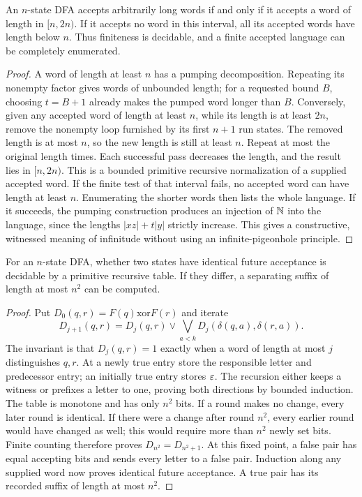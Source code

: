 \begin{theorem}\label{reg:finiteness}
An $n$-state DFA accepts arbitrarily long words if and only if it accepts
a word of length in $[n,2n)$.  If it accepts no word in this interval,
all its accepted words have length below $n$.  Thus finiteness is decidable,
and a finite accepted language can be completely enumerated.
\end{theorem}
\begin{proof}
A word of length at least $n$ has a pumping decomposition.  Repeating its
nonempty factor gives words of unbounded length; for a requested bound
$B$, choosing $t=B+1$ already makes the pumped word longer than $B$.
Conversely, given any accepted word of length at least $n$, while its
length is at least $2n$, remove the nonempty loop furnished by its first
$n+1$ run states.  The removed length is at most $n$, so the new length
is still at least $n$.  Repeat at most the original length times.  Each
successful pass decreases the length, and the result lies in $[n,2n)$.
This is a bounded primitive recursive normalization of a supplied
accepted word.  If the finite test of that interval fails, no accepted
word can have length at least $n$.  Enumerating the shorter words then
lists the whole language.  If it succeeds, the pumping construction
produces an injection of $\mathbb N$ into the language, since the lengths
$|xz|+t|y|$ strictly increase.  This gives a constructive, witnessed
meaning of infinitude without using an infinite-pigeonhole principle.
\end{proof}

\begin{proposition}\label{reg:distinguish}
For an $n$-state DFA, whether two states have identical future acceptance
is decidable by a primitive recursive table.  If they differ, a
separating suffix of length at most $n^2$ can be computed.
\end{proposition}
\begin{proof}
Put $D_0(q,r)=F(q)\mathbin{\mathrm{xor}}F(r)$ and iterate
\[
 D_{j+1}(q,r)=D_j(q,r)\vee
   \bigvee_{a<k}D_j(\delta(q,a),\delta(r,a)).
\]
The invariant is that $D_j(q,r)=1$ exactly when a word of length at most
$j$ distinguishes $q,r$.  At a newly true entry store the responsible
letter and predecessor entry; an initially true entry stores $\varepsilon$.
The recursion either keeps a witness or prefixes a letter to one, proving
both directions by bounded induction.
The table is monotone and has only $n^2$ bits.  If a round makes no
change, every later round is identical.  If there were a change after
round $n^2$, every earlier round would have changed as well; this would
require more than $n^2$ newly set bits.  Finite counting therefore proves
$D_{n^2}=D_{n^2+1}$.  At this fixed point, a false pair has equal accepting
bits and sends every letter to a false pair.  Induction along any supplied
word now proves identical future acceptance.  A true pair has its
recorded suffix of length at most $n^2$.
\end{proof}

